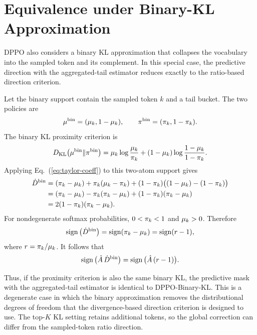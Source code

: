 \section{Equivalence under Binary-KL Approximation}
\label{app:binary-kl-equivalence}

DPPO also considers a binary KL approximation that collapses the vocabulary into
the sampled token and its complement. In this special case, the predictive
direction with the aggregated-tail estimator reduces exactly to the ratio-based
direction criterion.

Let the binary support contain the sampled token $k$ and a tail bucket. The two
policies are
\begin{equation}
\mu^{\mathrm{bin}}=(\mu_k, 1-\mu_k),
\qquad
\pi^{\mathrm{bin}}=(\pi_k, 1-\pi_k).
\end{equation}
The binary KL proximity criterion is
\begin{equation}
D_{\mathrm{KL}}\big(\mu^{\mathrm{bin}}\|\pi^{\mathrm{bin}}\big)
=
\mu_k\log\frac{\mu_k}{\pi_k}
+
(1-\mu_k)\log\frac{1-\mu_k}{1-\pi_k}.
\end{equation}
Applying Eq.~(\ref{eq:taylor-coeff}) to this two-atom support gives
\begin{align}
\dot{D}^{\mathrm{bin}}
&= (\pi_k-\mu_k)
+ \pi_k(\mu_k-\pi_k)
+ (1-\pi_k)\big((1-\mu_k)-(1-\pi_k)\big)
\nonumber\\
&= (\pi_k-\mu_k)
- \pi_k(\pi_k-\mu_k)
+ (1-\pi_k)(\pi_k-\mu_k)
\nonumber\\
&= 2(1-\pi_k)(\pi_k-\mu_k).
\label{eq:binary-kl-taylor}
\end{align}
For nondegenerate softmax probabilities, $0<\pi_k<1$ and $\mu_k>0$.
Therefore
\begin{equation}
\operatorname{sign}\big(\dot{D}^{\mathrm{bin}}\big)
=
\operatorname{sign}(\pi_k-\mu_k)
=
\operatorname{sign}(r-1),
\end{equation}
where $r=\pi_k/\mu_k$.
It follows that
\begin{equation}
\operatorname{sign}\big(\hat{A}\,\dot{D}^{\mathrm{bin}}\big)
=
\operatorname{sign}\big(\hat{A}\,(r-1)\big).
\end{equation}

Thus, if the proximity criterion is also the same binary KL, the predictive mask
with the aggregated-tail estimator is identical to DPPO-Binary-KL. This is a
degenerate case in which the binary approximation removes the distributional
degrees of freedom that the divergence-based direction criterion is designed to
use. The top-$K$ KL setting retains additional tokens, so the global correction
can differ from the sampled-token ratio direction.


